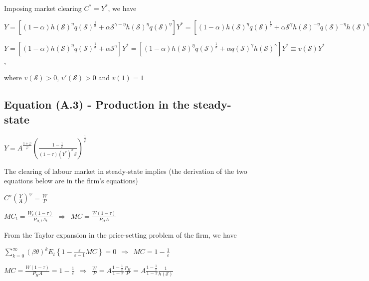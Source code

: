 \documentclass[
]{article}
\begin{document}
Imposing market clearing \(C^*=Y^*\), we have

\(\displaystyle Y=\left[ (1-\alpha)h(\mathcal{S})^{\eta} q(\mathcal{S})^\frac{1}{\sigma} + \alpha \mathcal{S}^{\gamma-\eta} h(\mathcal{S})^{\eta} q(\mathcal{S})^{\eta} \right]Y^* = \left[ (1-\alpha)h(\mathcal{S})^{\eta} q(\mathcal{S})^\frac{1}{\sigma} + \alpha \mathcal{S}^{\gamma} h(\mathcal{S})^{-\eta} q(\mathcal{S})^{-\eta} h(\mathcal{S})^{\eta} q(\mathcal{S})^{\eta} \right]Y^*\)

\(\displaystyle Y= \left[ (1-\alpha)h(\mathcal{S})^{\eta} q(\mathcal{S})^\frac{1}{\sigma} + \alpha \mathcal{S}^{\gamma} \right]Y^* = \left[ (1-\alpha)h(\mathcal{S})^{\eta} q(\mathcal{S})^\frac{1}{\sigma} + \alpha q(\mathcal{S})^{\gamma} h(\mathcal{S})^{\gamma} \right]Y^* \equiv v (\mathcal{S})Y^*\),

where \(v (\mathcal{S})>0\), \(v' (\mathcal{S})>0\) and \(v (1)=1\)

\vspace{12pt}

\hypertarget{equation-a.3---production-in-the-steady-state}{%
\subsection{Equation (A.3) - Production in the
steady-state}\label{equation-a.3---production-in-the-steady-state}}

\(\displaystyle Y= A^{\frac{1+\varphi}{\varphi}} \left( \frac{1-\frac{1}{\varepsilon}}{(1-\tau)(Y^*)^\sigma \mathcal{S}} \right)^\frac{1}{\varphi}\)

\vspace{8pt}

The clearing of labour market in steady-state implies (the derivation of
the two equations below are in the firm's equations)

\(\displaystyle C^\sigma \left( \frac{Y}{A} \right)^\varphi= \frac{W}{P}\)

\(\displaystyle MC_t = \frac{W_t(1-\tau)}{P_{H,t} A_t} \ \ \Rightarrow \ \  MC = \frac{W(1-\tau)}{P_{H} A}\)

From the Taylor expansion in the price-setting problem of the firm, we
have

\(\displaystyle \sum_{k=0}^\infty (\beta \theta)^kE_t \left\{ 1-\frac{\varepsilon}{\varepsilon-1} MC \right\}=0 \ \ \Rightarrow \ \ MC=1-\frac{1}{\varepsilon}\)

\(\displaystyle MC = \frac{W(1-\tau)}{P_{H} A} = 1-\frac{1}{\varepsilon} \ \ \Rightarrow \ \ \frac{W}{P}=A \frac{1-\frac{1}{\varepsilon}}{1-\tau} \frac{P_H}{P}=A \frac{1-\frac{1}{\varepsilon}}{1-\tau} \frac{1}{h (\mathcal{S})}\)
\end{document}
